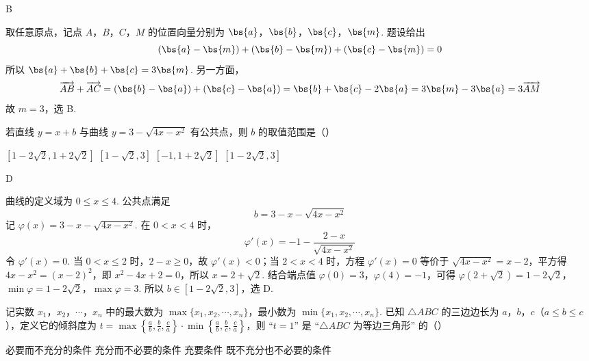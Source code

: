 \begin{answer}
B
\end{answer}

\begin{solution}
取任意原点，记点 \(A\)，\(B\)，\(C\)，\(M\) 的位置向量分别为 \(\bs{a}\)，\(\bs{b}\)，\(\bs{c}\)，\(\bs{m}\). 题设给出
\[
(\bs{a}-\bs{m})+(\bs{b}-\bs{m})+(\bs{c}-\bs{m})=0
\]
所以 \(\bs{a}+\bs{b}+\bs{c}=3\bs{m}\). 另一方面，
\[
\overrightarrow{AB}+\overrightarrow{AC}
=(\bs{b}-\bs{a})+(\bs{c}-\bs{a})
=\bs{b}+\bs{c}-2\bs{a}
=3\bs{m}-3\bs{a}
=3\overrightarrow{AM}
\]
故 \(m=3\)，选 B.
\end{solution}

\begin{problem}
若直线 \( y = x + b \) 与曲线 \( y = 3 - \sqrt{4x - x^2} \) 有公共点，则 \( b \) 的取值范围是（\quad）

\choices
    {\([1 - 2\sqrt{2}, 1 + 2\sqrt{2}]\)}
    {\([1 - \sqrt{2}, 3]\)}
    {\([-1, 1 + 2\sqrt{2}]\)}
    {\([1 - 2\sqrt{2}, 3]\)}
\end{problem}

\begin{answer}
D
\end{answer}

\begin{solution}
曲线的定义域为 \(0\leqslant x\leqslant4\). 公共点满足
\[
b=3-x-\sqrt{4x-x^2}
\]
记 \(\varphi(x)=3-x-\sqrt{4x-x^2}\). 在 \(0<x<4\) 时，
\[
\varphi'(x)=-1-\frac{2-x}{\sqrt{4x-x^2}}
\]
令 \(\varphi'(x)=0\). 当 \(0<x\leqslant2\) 时，\(2-x\geqslant0\)，故 \(\varphi'(x)<0\)；当 \(2<x<4\) 时，方程 \(\varphi'(x)=0\) 等价于 \(\sqrt{4x-x^2}=x-2\)，平方得 \(4x-x^2=(x-2)^2\)，即 \(x^2-4x+2=0\)，所以 \(x=2+\sqrt{2}\). 结合端点值 \(\varphi(0)=3\)，\(\varphi(4)=-1\)，可得
\(\varphi(2+\sqrt{2})=1-2\sqrt{2}\)，\(\min\varphi=1-2\sqrt{2}\)，\(\max\varphi=3\).
所以 \(b\in[1-2\sqrt{2},3]\)，选 D.
\end{solution}

\begin{problem}
记实数 \(x_{1}\)，\(x_{2}\)，\(\cdots\)，\(x_{n}\) 中的最大数为 \(\max \{x_{1}, x_{2}, \cdots, x_{n}\}\)，最小数为 \(\min \{x_{1}, x_{2}, \cdots, x_{n}\}\). 已知 \(\triangle ABC\) 的三边边长为 \(a\)，\(b\)，\(c\)（\(a \leqslant b \leqslant c\)），定义它的倾斜度为 \(t = \max \left\{\frac{a}{b}, \frac{b}{c}, \frac{c}{a}\right\} \cdot \min \left\{\frac{a}{b}, \frac{b}{c}, \frac{c}{a}\right\}\)，则 “\(t = 1\)” 是 “\(\triangle ABC\) 为等边三角形” 的（\quad）

\choices
    {必要而不充分的条件}
    {充分而不必要的条件}
    {充要条件}
    {既不充分也不必要的条件}
\end{problem}

